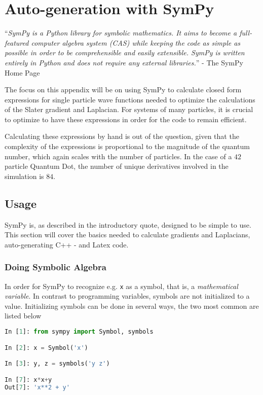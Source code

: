 
\chapter{Auto-generation with SymPy}
\label{appendix:sympy}

``\textit{SymPy is a Python library for symbolic mathematics. It aims to become a full-featured computer algebra system (CAS) while keeping the code as simple as possible in order to be comprehensible and easily extensible. SymPy is written entirely in Python and does not require any external libraries.}'' - The SymPy Home Page

The focus on this appendix will be on using SymPy to calculate closed form expressions for single particle wave functions needed to optimize the calculations of the Slater gradient and Laplacian. For systems of many particles, it is crucial to optimize to have these expressions in order for the code to remain efficient. 

Calculating these expressions by hand is out of the question, given that the complexity of the expressions is proportional to the magnitude of the quantum number, which again scales with the number of particles. In the case of a $42$ particle Quantum Dot, the number of unique derivatives involved in the simulation is $84$. 

\section{Usage}

SymPy is, as described in the introductory quote, designed to be simple to use. This section will cover the basics needed to calculate gradients and Laplacians, auto-generating C++ - and Latex code.

\subsection{Doing Symbolic Algebra}

In order for SymPy to recognize e.g. \verb+x+ as a symbol, that is, a \textit{mathematical variable}. In contrast to programming variables, symbols are not initialized to a value. Initializing symbols can be done in several ways, the two most common are listed below

\begin{lstlisting}[language=Python]
In [1]: from sympy import Symbol, symbols

In [2]: x = Symbol('x')

In [3]: y, z = symbols('y z')

In [7]: x*x+y
Out[7]: 'x**2 + y'

\end{lstlisting}

